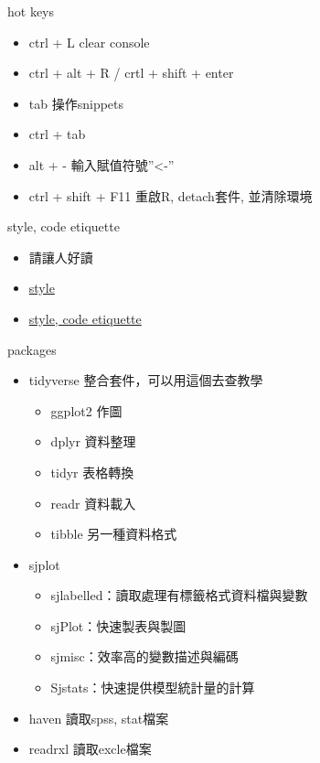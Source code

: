\documentclass[
  ignorenonframetext,
]{beamer}
\providecommand{\tightlist}{%
  \setlength{\itemsep}{0pt}\setlength{\parskip}{0pt}}
\begin{document}
\begin{frame}{hot keys}
\protect\hypertarget{hot-keys}{}
\begin{itemize}
\tightlist
\item
  ctrl + L clear console
\item
  ctrl + alt + R / crtl + shift + enter
\item
  tab 操作snippets
\item
  ctrl + tab
\item
  alt + - 輸入賦值符號''\textless-''
\item
  ctrl + shift + F11 重啟R, detach套件, 並清除環境
\end{itemize}
\end{frame}

\begin{frame}{style, code etiquette}
\protect\hypertarget{style-code-etiquette}{}
\begin{itemize}
\tightlist
\item
  請讓人好讀
\item
  \href{https://bookdown.org/tonykuoyj/eloquentr/styleguide.html}{style}
\item
  \href{https://style.tidyverse.org/syntax.html}{style, code etiquette}
\end{itemize}
\end{frame}

\begin{frame}{packages}
\protect\hypertarget{packages}{}
\begin{itemize}
\tightlist
\item
  tidyverse 整合套件，可以用這個去查教學

  \begin{itemize}
  \tightlist
  \item
    ggplot2 作圖
  \item
    dplyr 資料整理
  \item
    tidyr 表格轉換
  \item
    readr 資料載入
  \item
    tibble 另一種資料格式
  \end{itemize}
\item
  sjplot

  \begin{itemize}
  \tightlist
  \item
    sjlabelled：讀取處理有標籤格式資料檔與變數
  \item
    sjPlot：快速製表與製圖
  \item
    sjmisc：效率高的變數描述與編碼
  \item
    Sjstats：快速提供模型統計量的計算
  \end{itemize}
\item
  haven 讀取spss, stat檔案
\item
  readrxl 讀取excle檔案
\end{itemize}
\end{frame}
\end{document}
